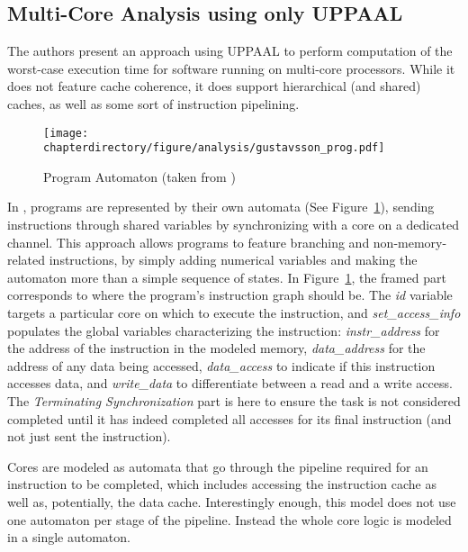 \stopallthesefloats
\subsection{Multi-Core Analysis using only UPPAAL}
The authors \cite{conf/wcet/GustavssonELP10} present an approach using UPPAAL
to perform computation of the worst-case execution time for software running
on multi-core processors. While it does not feature cache coherence, it does
support hierarchical (and shared) caches, as well as some sort of instruction
pipelining.

\begin{figure}[hbt!]
\begin{center}
\texttt{[image: \\chapterdirectory/figure/analysis/gustavsson\_prog.pdf]}
\end{center}
\caption{Program Automaton (taken from \cite{conf/wcet/GustavssonELP10})}%
\label{fig:formal_analysis:gustavsson_program}
\end{figure}

In \cite{conf/wcet/GustavssonELP10}, programs are represented by their own
automata (See Figure~\ref{fig:formal_analysis:gustavsson_program}), sending
instructions through shared variables by synchronizing with a core on
a dedicated channel. This approach allows programs to feature branching and
non-memory-related instructions, by simply adding numerical variables and
making the automaton more than a simple sequence of states. In
Figure~\ref{fig:formal_analysis:gustavsson_program}, the framed part corresponds
to where the program's instruction graph should be. The \textit{id} variable
targets a particular core on which to execute the instruction, and
\textit{set\_access\_info} populates the global variables characterizing the
instruction: \textit{instr\_address} for the address of the instruction in the
modeled memory, \textit{data\_address} for the address of any data being
accessed, \textit{data\_access} to indicate if this instruction accesses data,
and \textit{write\_data} to differentiate between a read and a write access.
The \textit{Terminating Synchronization} part is here to ensure the task is not
considered completed until it has indeed completed all accesses for its final
instruction (and not just sent the instruction).

Cores are modeled as automata that go through the pipeline required for an
instruction to be completed, which includes accessing the instruction cache as
well as, potentially, the data cache. Interestingly enough, this model does not
use one automaton per stage of the pipeline. Instead the whole core logic is
modeled in a single automaton.


